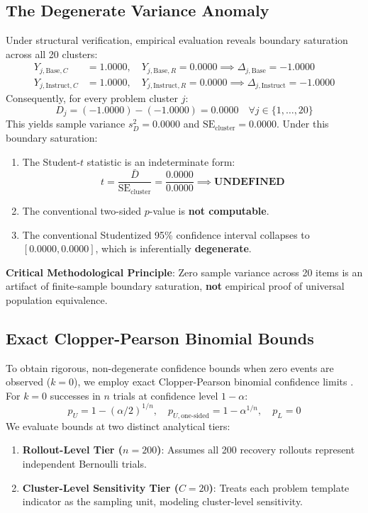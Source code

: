 \documentclass[11pt,letterpaper]{article}
\begin{document}
\subsection{The Degenerate Variance Anomaly}
Under structural verification, empirical evaluation reveals boundary saturation across all 20 clusters:
\begin{align}
Y_{j, \text{Base}, C} &= 1.0000, \quad Y_{j, \text{Base}, R} = 0.0000 \implies \Delta_{j, \text{Base}} = -1.0000 \\
Y_{j, \text{Instruct}, C} &= 1.0000, \quad Y_{j, \text{Instruct}, R} = 0.0000 \implies \Delta_{j, \text{Instruct}} = -1.0000
\end{align}
Consequently, for every problem cluster $j$:
\begin{equation}
D_j = (-1.0000) - (-1.0000) = 0.0000 \quad \forall j \in \{1, \dots, 20\}
\end{equation}
This yields sample variance $s_D^2 = 0.0000$ and $\mathrm{SE}_{\text{cluster}} = 0.0000$. Under this boundary saturation:
\begin{enumerate}
    \item The Student-$t$ statistic is an indeterminate form:
    \begin{equation}
    t = \frac{\bar{D}}{\mathrm{SE}_{\text{cluster}}} = \frac{0.0000}{0.0000} \implies \textbf{UNDEFINED}
    \end{equation}
    \item The conventional two-sided $p$-value is \textbf{not computable}.
    \item The conventional Studentized 95\% confidence interval collapses to $[0.0000, 0.0000]$, which is inferentially \textbf{degenerate}.
\end{enumerate}
\textbf{Critical Methodological Principle}: Zero sample variance across 20 items is an artifact of finite-sample boundary saturation, \textbf{not} empirical proof of universal population equivalence.

\subsection{Exact Clopper-Pearson Binomial Bounds}
To obtain rigorous, non-degenerate confidence bounds when zero events are observed ($k=0$), we employ exact Clopper-Pearson binomial confidence limits \cite{clopper1934use}. For $k=0$ successes in $n$ trials at confidence level $1 - \alpha$:
\begin{equation}
p_U = 1 - (\alpha/2)^{1/n}, \quad p_{U, \text{one-sided}} = 1 - \alpha^{1/n}, \quad p_L = 0
\end{equation}
We evaluate bounds at two distinct analytical tiers:
\begin{enumerate}
    \item \textbf{Rollout-Level Tier ($n=200$)}: Assumes all 200 recovery rollouts represent independent Bernoulli trials.
    \item \textbf{Cluster-Level Sensitivity Tier ($C=20$)}: Treats each problem template indicator as the sampling unit, modeling cluster-level sensitivity.
\end{enumerate}
\end{document}
